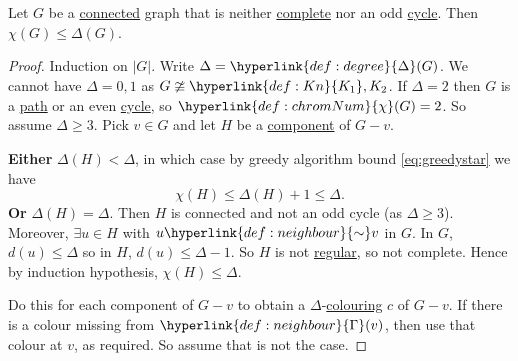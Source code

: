\documentclass{article}
\begin{document}
\begin{nthm}\label{thm:28}
    Let $G$ be a \hyperlink{def:components}{connected} graph that is neither \hyperlink{def:Kn}{complete} nor an odd \hyperlink{def:Cn}{cycle}.
    Then $\chi(G) \leq \Delta(G)$.
\end{nthm}
\begin{proof}
    Induction on \hyperlink{def:order}{$|G|$}. Write $\Delta = \hyperlink{def:degree}{\Delta}(G)$.
    We cannot have $\Delta = 0,1$ as $G \ncong \hyperlink{def:Kn}{K_1}, K_2$.
    If $\Delta = 2$ then $G$ is a \hyperlink{def:Pn}{path} or an even \hyperlink{def:Cn}{cycle}, so $\hyperlink{def:chromNum}{\chi}(G) = 2$.
    So assume $\Delta \geq 3$. Pick $v \in G$ and let $H$ be a \hyperlink{def:component}{component} of $G - v$.

    \textbf{Either} $\Delta(H) < \Delta$, in which case by greedy algorithm bound \eqref{eq:greedystar} we have \begin{equation*}\chi(H) \leq \Delta(H) + 1 \leq \Delta.\end{equation*}
    \textbf{Or} $\Delta(H) = \Delta$. Then $H$ is connected and not an odd cycle (as $\Delta \geq 3$).
    Moreover, $\exists u \in H$ with $u \hyperlink{def:neighbour}{\sim} v$ in $G$.
    In $G$, $d(u) \leq \Delta$ so in $H$, $d(u) \leq \Delta - 1$.
    So $H$ is not \hyperlink{def:regular}{regular}, so not complete.
    Hence by induction hypothesis, $\chi(H) \leq \Delta$.

    Do this for each component of $G - v$ to obtain a $\Delta$-\hyperlink{def:colour}{colouring} $c$ of $G - v$.
    If there is a colour missing from $\hyperlink{def:neighbour}{\Gamma}(v)$, then use that colour at $v$, as required.
    So assume that is not the case.


\end{proof}
\end{document}
